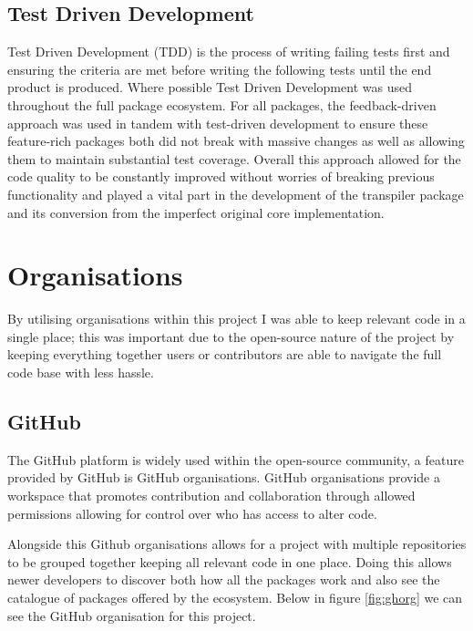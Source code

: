 \documentclass{l4proj}
\begin{document}
\subsection{Test Driven Development}

Test Driven Development (TDD) is the process of writing failing tests first and ensuring the criteria are met before writing the following tests until the end product is produced. Where possible Test Driven Development was used throughout the full package ecosystem. For all packages, the feedback-driven approach was used in tandem with test-driven development to ensure these feature-rich packages both did not break with massive changes as well as allowing them to maintain substantial test coverage. Overall this approach allowed for the code quality to be constantly improved without worries of breaking previous functionality and played a vital part in the development of the transpiler package and its conversion from the imperfect original core implementation.

\section{Organisations}

By utilising organisations within this project I was able to keep relevant code in a single place; this was important due to the open-source nature of the project by keeping everything together users or contributors are able to navigate the full code base with less hassle.

\subsection{GitHub}
The GitHub platform is widely used within the open-source community, a feature provided by GitHub is GitHub organisations. GitHub organisations provide a workspace that promotes contribution and collaboration through allowed permissions allowing for control over who has access to alter code. 

\text Alongside this Github organisations allows for a project with multiple repositories to be grouped together keeping all relevant code in one place. Doing this allows newer developers to discover both how all the packages work and also see the catalogue of packages offered by the ecosystem. Below in figure \ref{fig:ghorg} we can see the GitHub organisation for this project.
\end{document}
